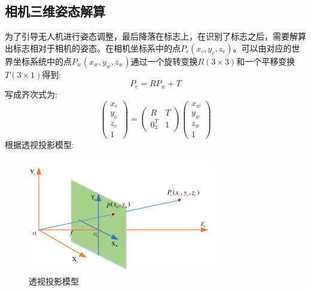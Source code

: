 \subsection{相机三维姿态解算}

为了引导无人机进行姿态调整，最后降落在标志上，在识别了标志之后，需要解算出标志相对于相机的姿态。在相机坐标系中的点$P_c(x_c,y_c,z_c)$。可以由对应的世界坐标系统中的点$P_w(x_w,y_w,z_w)$通过一个旋转变换$R(3\times3)$和一个平移变换$T(3\times1)$得到:
\begin{equation}
P_c=RP_w+T
\end{equation}
写成齐次式为:
\begin{equation}\label{齐次式}
\begin{pmatrix}
x_c \\
y_c \\
z_c \\
1    \end{pmatrix} = \begin{pmatrix}
R & T\\
0_3^T & 1 \end{pmatrix}
\begin{pmatrix}
x_w \\
y_w \\
z_w \\
1    \end{pmatrix}
\end{equation}
根据透视投影模型:
\begin{figure}[h]
    \centering
    \includegraphics[height=5cm]{figures/透视投影模型.pdf}
    \caption{透视投影模型}\label{透视投影模型}
\end{figure}
 
